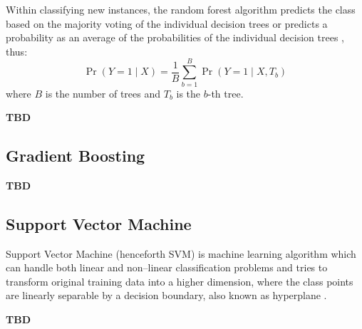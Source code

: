 Within classifying new instances, the random forest algorithm predicts the class based on the majority voting of the individual decision trees or predicts a probability as an average of the probabilities of the individual decision trees \citep{randomforestmalley}, thus:
\begin{equation}
    \operatorname{Pr}\left(Y=1 \mid X \right) = \frac{1}{B} \sum_{b=1}^{B} \operatorname{Pr}\left(Y=1 \mid X, T_b \right)
\end{equation}
where $B$ is the number of trees and $T_b$ is the $b$-th tree.

\textbf{TBD}
\subsection{Gradient Boosting}

\textbf{TBD}
\subsection{Support Vector Machine}

Support Vector Machine (henceforth SVM) is machine learning algorithm which can handle both linear and non--linear classification problems and tries to transform original training data into a higher dimension, where the class points are linearly separable by a decision boundary, also known as hyperplane \citep{han2011data}.

\textbf{TBD}
